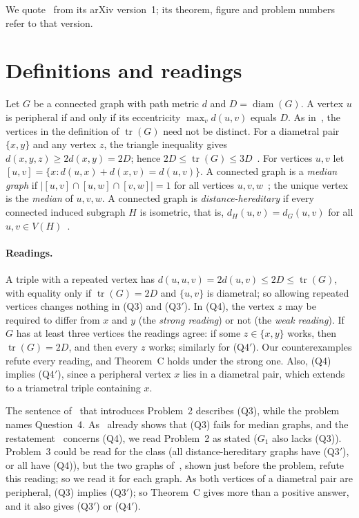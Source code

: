 \documentclass[11pt]{article}
\theoremstyle{remark}
\DeclareMathOperator{\diam}{diam}
\DeclareMathOperator{\tr}{tr}
\newcommand{\QA}{\textup{(Q3)}}
\newcommand{\QAp}{\textup{(Q3$'$)}}
\newcommand{\QB}{\textup{(Q4)}}
\newcommand{\QBp}{\textup{(Q4$'$)}}
\begin{document}
We quote~\cite{hko} from its arXiv version~1; its theorem, figure and problem
numbers refer to that version.

\section{Definitions and readings}\label{sec:defs}
Let $G$ be a connected graph with path metric $d$ and $D=\diam(G)$. A vertex
$u$ is peripheral if and only if its eccentricity $\max_vd(u,v)$ equals $D$. As
in~\cite{hko}, the vertices in the definition of $\tr(G)$ need not be distinct.
For a diametral pair $\{x,y\}$ and any vertex $z$, the triangle inequality gives
$d(x,y,z)\ge2d(x,y)=2D$; hence $2D\le\tr(G)\le3D$~\cite[Proposition~2.1]{hko}.
For vertices $u,v$ let $[u,v]=\{x:d(u,x)+d(x,v)=d(u,v)\}$. A connected graph is
a \emph{median graph} if $|[u,v]\cap[u,w]\cap[v,w]|=1$ for all vertices
$u,v,w$~\cite{mulder}; the unique vertex is the \emph{median} of $u,v,w$. A
connected graph is \emph{distance-hereditary} if every connected induced
subgraph $H$ is isometric, that is, $d_H(u,v)=d_G(u,v)$ for all
$u,v\in V(H)$~\cite{howorka}.

\paragraph{Readings.}
A triple with a repeated vertex has $d(u,u,v)=2d(u,v)\le2D\le\tr(G)$, with
equality only if $\tr(G)=2D$ and $\{u,v\}$ is diametral; so allowing repeated
vertices changes nothing in \QA{} and \QAp. In \QB, the vertex $z$ may be
required to differ from $x$ and $y$ (the \emph{strong reading}) or not (the
\emph{weak reading}). If $G$ has at least three vertices the readings agree: if
some $z\in\{x,y\}$ works, then $\tr(G)=2D$, and then every $z$ works; similarly
for \QBp. Our counterexamples refute every reading, and Theorem~C holds under
the strong one. Also, \QB{} implies \QBp, since a peripheral vertex $x$ lies in
a diametral pair, which extends to a triametral triple containing $x$.

The sentence of~\cite{hko} that introduces Problem~2 describes \QA, while
the problem names Question~4. As~\cite[Figure~4]{hko} already shows that \QA{}
fails for median graphs, and the restatement~\cite{lsb,mo-q} concerns \QB, we
read Problem~2 as stated ($G_1$ also lacks \QA). Problem~3 could be read for
the class (all distance-hereditary graphs have \QAp, or all have \QB), but the
two graphs of~\cite[Figure~3]{hko}, shown just before the problem, refute this
reading; so we read it for each graph. As both vertices of a diametral pair are
peripheral, \QA{} implies \QAp; so Theorem~C gives more than a positive answer,
and it also gives \QAp{} or \QBp.
\end{document}

